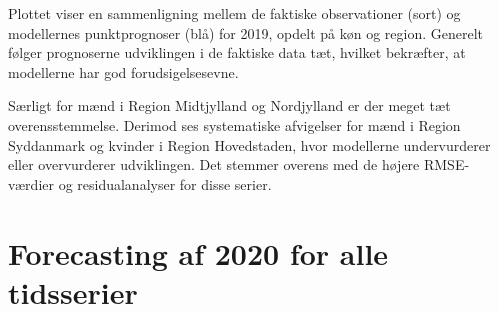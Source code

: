 \documentclass[
]{article}
\begin{document}
Plottet viser en sammenligning mellem de faktiske observationer (sort)
og modellernes punktprognoser (blå) for 2019, opdelt på køn og region.
Generelt følger prognoserne udviklingen i de faktiske data tæt, hvilket
bekræfter, at modellerne har god forudsigelsesevne.

Særligt for mænd i Region Midtjylland og Nordjylland er der meget tæt
overensstemmelse. Derimod ses systematiske afvigelser for mænd i Region
Syddanmark og kvinder i Region Hovedstaden, hvor modellerne
undervurderer eller overvurderer udviklingen. Det stemmer overens med de
højere RMSE-værdier og residualanalyser for disse serier.

\section{Forecasting af 2020 for alle
tidsserier}\label{forecasting-af-2020-for-alle-tidsserier}
\end{document}
